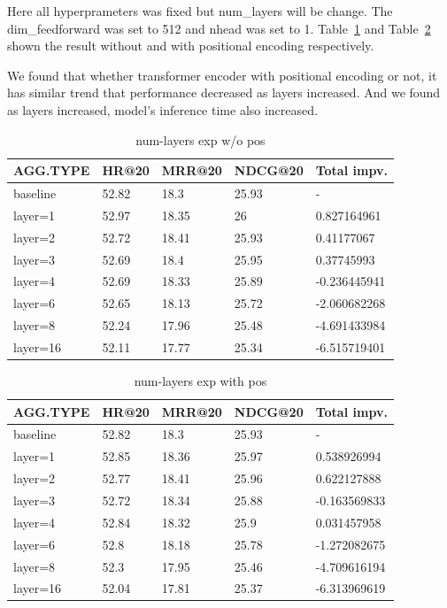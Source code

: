 \documentclass{article}
\begin{document}
Here all hyperprameters was fixed but num\_layers will be change.
The dim\_feedforward was set to 512 and nhead was set to 1.
Table~\ref{num-layers exp w/o pos} and Table~\ref{num-layers exp with pos}
shown the result without and with positional encoding respectively.

We found that whether transformer encoder with positional encoding or not,
it has similar trend that performance decreased as layers increased.
And we found as layers increased, model's inference time also increased.

\begin{table}
    \caption{num-layers exp w/o pos}
    \label{num-layers exp w/o pos}
    \centering
    \begin{tabular}{lllll}
        \toprule
        AGG.TYPE & HR@20 & MRR@20 & NDCG@20 & Total impv.  \\
        \midrule
        baseline & 52.82 & 18.3   & 25.93   & -            \\
        layer=1  & 52.97 & 18.35  & 26      & 0.827164961  \\
        layer=2  & 52.72 & 18.41  & 25.93   & 0.41177067   \\
        layer=3  & 52.69 & 18.4   & 25.95   & 0.37745993   \\
        layer=4  & 52.69 & 18.33  & 25.89   & -0.236445941 \\
        layer=6  & 52.65 & 18.13  & 25.72   & -2.060682268 \\
        layer=8  & 52.24 & 17.96  & 25.48   & -4.691433984 \\
        layer=16 & 52.11 & 17.77  & 25.34   & -6.515719401 \\
        \bottomrule
    \end{tabular}
\end{table}

\begin{table}
    \caption{num-layers exp with pos}
    \label{num-layers exp with pos}
    \centering
    \begin{tabular}{lllll}
        \toprule
        AGG.TYPE & HR@20 & MRR@20 & NDCG@20 & Total impv.  \\
        \midrule
        baseline & 52.82 & 18.3   & 25.93   & -            \\
        layer=1  & 52.85 & 18.36  & 25.97   & 0.538926994  \\
        layer=2  & 52.77 & 18.41  & 25.96   & 0.622127888  \\
        layer=3  & 52.72 & 18.34  & 25.88   & -0.163569833 \\
        layer=4  & 52.84 & 18.32  & 25.9    & 0.031457958  \\
        layer=6  & 52.8  & 18.18  & 25.78   & -1.272082675 \\
        layer=8  & 52.3  & 17.95  & 25.46   & -4.709616194 \\
        layer=16 & 52.04 & 17.81  & 25.37   & -6.313969619 \\
        \bottomrule
    \end{tabular}
\end{table}
\end{document}
